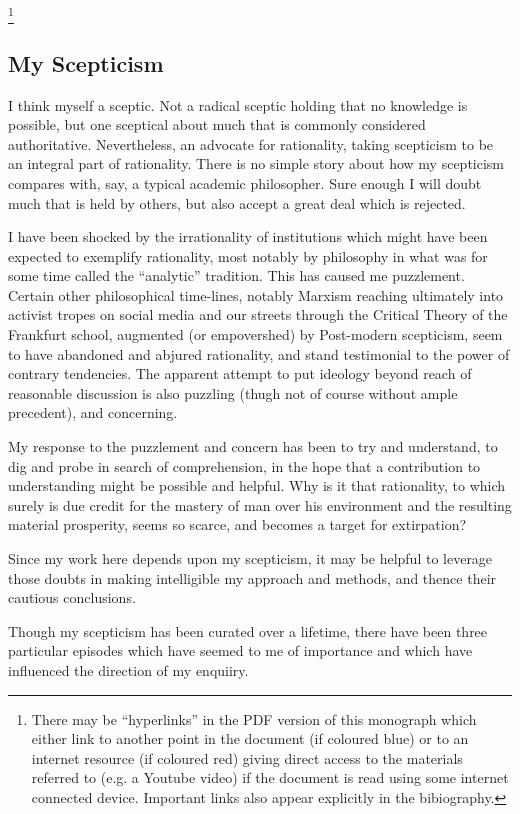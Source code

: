 \documentclass[10pt,titlepage]{book}
\begin{document}
\footnote{There may be ``hyperlinks'' in the PDF version of this monograph which either link to another point in the document  (if coloured blue) or to an internet resource  (if coloured red) giving direct access to the materials referred to (e.g. a Youtube video) if the document is read using some internet connected device.
  Important links also appear explicitly in the bibiography.}

\subsection{My Scepticism}

I think myself a sceptic.
Not a radical sceptic holding that no knowledge is possible, but one sceptical about much that is commonly considered authoritative.
Nevertheless, an advocate for rationality, taking scepticism to be an integral part of rationality.
There is no simple story about how my scepticism compares with, say, a typical academic philosopher.
Sure enough I will doubt much that is held by others, but also accept a great deal which is rejected.

I have been shocked by the irrationality of institutions which might have been expected to exemplify rationality, most notably by philosophy in what was for some time called the ``analytic'' tradition.
This has caused me puzzlement.
Certain other philosophical time-lines, notably Marxism reaching ultimately into activist tropes on social media and our streets through the Critical Theory of the Frankfurt school, augmented (or empovershed) by Post-modern scepticism, seem to have abandoned and abjured rationality, and stand testimonial to the power of contrary tendencies.
The apparent attempt to put ideology beyond reach of reasonable discussion is also puzzling (thugh not of course without ample precedent), and concerning.

My response to the puzzlement and concern has been to try and understand, to dig and probe in search of comprehension, in the hope that a contribution to understanding might be possible and helpful.
Why is it that rationality, to which surely is due credit for the mastery of man over his environment and the resulting material prosperity, seems so scarce, and becomes a target for extirpation?

Since my work here depends upon my scepticism, it may be helpful to leverage those doubts in making intelligible my approach and methods, and thence their cautious conclusions.

Though my scepticism has been curated over a lifetime, there have been three particular episodes which have seemed to me of importance and which have influenced the direction of my enquiiry.
\end{document}
